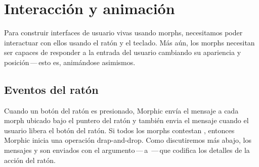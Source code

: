 \documentclass[a4paper,10pt,twoside]{book}
\begin{document}





\section{Interacci\'on y animaci\'on }

Para construir interfaces de usuario vivas usando morphs, necesitamos poder interactuar con ellos usando el rat\'on y el teclado. 
Más aún, los morphs necesitan ser capaces de responder a la entrada del usuario cambiando su apariencia y posici\'on\,---\,esto es, anim\'andose asimismos.


\subsection{Eventos del rat\'on}

Cuando un bot\'on del rat\'on es presionado, Morphic env\'ia el mensaje  a cada morph ubicado bajo el puntero del rat\'on y también envia el mensaje  cuando el usuario libera el bot\'on del rat\'on.
Si todos los morphs contestan , entonces Morphic inicia una operaci\'on drap-and-drop.
Como discutiremos m\'as abajo, los mensajes  y  son enviados con el argumento\,---\,a  \,---\,que codifica los detalles de la acci\'on del rat\'on.
\end{document}
